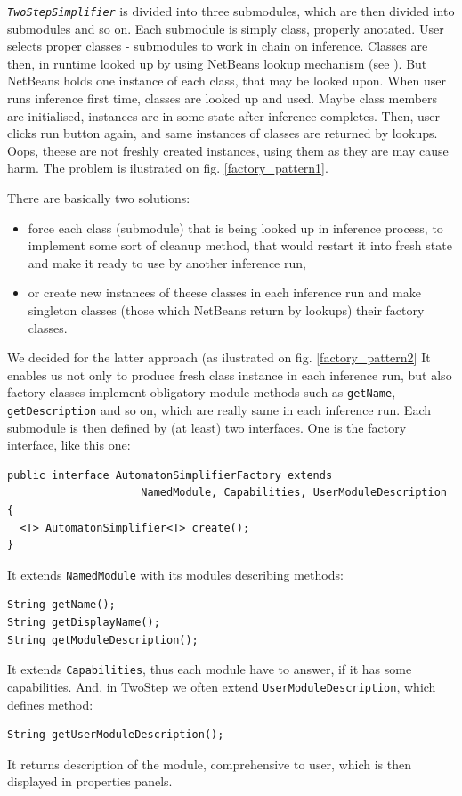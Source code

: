 \documentclass[a4paper,10pt,oneside]{article}
\newcommand{\code}[1]{\texttt{#1}}
\newcommand{\jmodule}[1]{\texttt{\textit{#1}}}
\begin{document}
\jmodule{TwoStepSimplifier} is divided into three submodules, which are then divided into submodules and so on.
Each submodule is simply class, properly anotated.
User selects proper classes - submodules to work in chain on inference.
Classes are then, in runtime looked up by using NetBeans lookup mechanism (see \cite[p. 16]{archdoc}).
But NetBeans holds one instance of each class, that may be looked upon.
When user runs inference first time, classes are looked up and used.
Maybe class members are initialised, instances are in some state after inference completes.
Then, user clicks run button again, and same instances of classes are returned by lookups.
Oops, theese are not freshly created instances, using them as they are may cause harm.
The problem is ilustrated on fig. \ref{factory_pattern1}.

There are basically two solutions:
\begin{itemize}
	\item force each class (submodule) that is being looked up in inference process, to implement
some sort of cleanup method, that would restart it into fresh state and make it ready to use by another 
inference run,
	\item or create new instances of theese classes in each inference run and make singleton classes (those which NetBeans return by lookups) their factory classes.
\end{itemize}
We decided for the latter approach (as ilustrated on fig. \ref{factory_pattern2}
It enables us not only to produce fresh class instance in each inference run, but also factory classes implement obligatory
module methods such as \code{getName}, \code{getDescription} and so on, which are really same in each inference run.
Each submodule is then defined by (at least) two interfaces.
One is the factory interface, like this one:
\begin{verbatim}
public interface AutomatonSimplifierFactory extends 
                     NamedModule, Capabilities, UserModuleDescription {
  <T> AutomatonSimplifier<T> create();
}
\end{verbatim}
It extends \code{NamedModule} with its modules describing methods:
\begin{verbatim}
String getName();
String getDisplayName();
String getModuleDescription();
\end{verbatim}
It extends \code{Capabilities}, thus each module have to answer, if it has some capabilities.
And, in TwoStep we often extend \code{UserModuleDescription}, which defines method:
\begin{verbatim}
String getUserModuleDescription();
\end{verbatim}
It returns description of the module, comprehensive to user, which is then displayed in properties panels.
\end{document}
